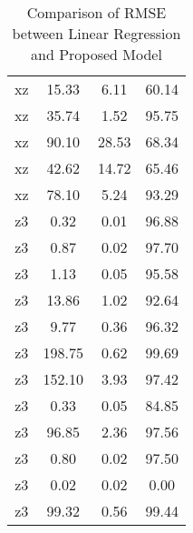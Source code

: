 \begin{table}[h]
\begin{tabular}{|c|c|c|c|}
        xz & 15.33 & 6.11 & 60.14 \\
        xz & 35.74 & 1.52 & 95.75 \\
        xz & 90.10 & 28.53 & 68.34 \\
        xz & 42.62 & 14.72 & 65.46 \\
        xz & 78.10 & 5.24 & 93.29 \\
        z3 & 0.32 & 0.01 & 96.88 \\
        z3 & 0.87 & 0.02 & 97.70 \\
        z3 & 1.13 & 0.05 & 95.58 \\
        z3 & 13.86 & 1.02 & 92.64 \\
        z3 & 9.77 & 0.36 & 96.32 \\
        z3 & 198.75 & 0.62 & 99.69 \\
        z3 & 152.10 & 3.93 & 97.42 \\
        z3 & 0.33 & 0.05 & 84.85 \\
        z3 & 96.85 & 2.36 & 97.56 \\
        z3 & 0.80 & 0.02 & 97.50 \\
        z3 & 0.02 & 0.02 & 0.00 \\
        z3 & 99.32 & 0.56 & 99.44 \\
        \hline
    \end{tabular}
    \caption{Comparison of RMSE between Linear Regression and Proposed Model}
    \label{tab:rmse}
\end{table}


